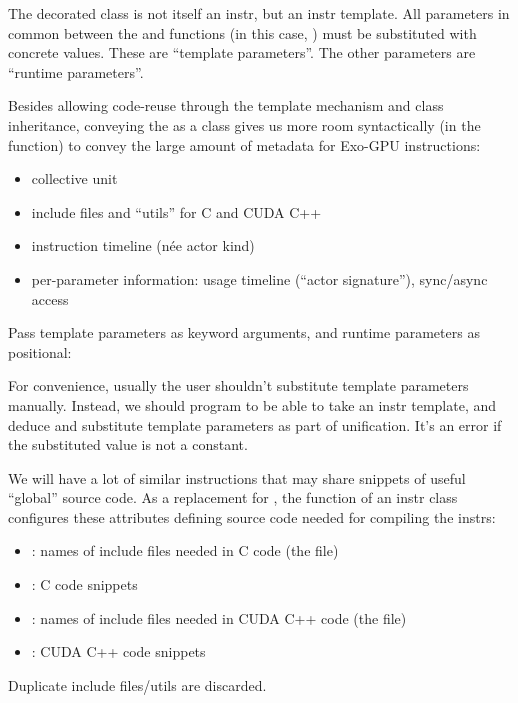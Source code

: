 

\filbreak
The decorated class is not itself an instr, but an instr template.
All parameters in common between the  and  functions (in this case, ) must be substituted with concrete values.
These are ``template parameters''.
The other  parameters are ``runtime parameters''.



\filbreak
Besides allowing code-reuse through the template mechanism and class inheritance, conveying the  as a class gives us more room syntactically (in the  function) to convey the large amount of metadata for Exo-GPU instructions:
\begin{itemize}
  \item collective unit
  \filbreak
  \item include files and ``utils'' for C and CUDA C++
  \filbreak
  \item instruction timeline (n\'ee actor kind)
  \filbreak
  \item per-parameter information: usage timeline (``actor signature''), sync/async access
\end{itemize}

\filbreak
{}

Pass template parameters as keyword arguments, and runtime parameters as positional:



\filbreak
{}

For convenience, usually the user shouldn't substitute template parameters manually.
Instead, we should program  to be able to take an instr template, and deduce and substitute template parameters as part of unification.
It's an error if the substituted value is not a constant.

\filbreak
{}

We will have a lot of similar instructions that may share snippets of useful ``global'' source code.
As a replacement for , the  function of an instr class configures these attributes defining source code needed for compiling the instrs:
\begin{itemize}
\item {}: names of include files needed in C code (the  file)
\item {}: C code snippets
\item {}: names of include files needed in CUDA C++ code (the  file)
\item {}: CUDA C++ code snippets
\end{itemize}
Duplicate include files/utils are discarded.

